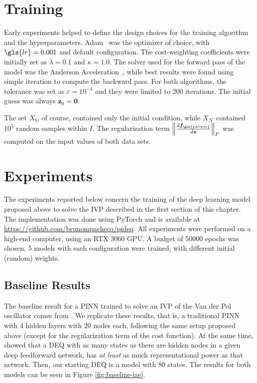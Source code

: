 \section{Training}

Early experiments helped to define the design choices for the training algorithm and the hyperparameters.
Adam~\cite{kingma_adam_2015} was the optimizer of choice, with $\gls{lr}=0.001$ and default configuration.
The cost-weighting coefficients were initially set as $\lambda=0.1$ and $\kappa=1.0$.
The solver used for the forward pass of the model was the Anderson Acceleration~\cite{walker_anderson_2011}, while best results were found using simple iteration to compute the backward pass.
For both algorithms, the tolerance was set as $\varepsilon=10^{-4}$ and they were limited to 200 iterations.
The initial guess was always $\bm{z}_0=\bm{0}$.

The set $X_b$, of course, contained only the initial condition, while $X_{\mathcal{N}}$ contained $10^5$ random samples within $I$.
The regularization term $\left\lVert \frac{d \bm{f}_{\gls{param}}}{d \bm{z}}\right\rVert_F$ was computed on the input values of both data sets.

\section{Experiments}

The experiments reported below concern the training of the deep learning model proposed above to solve the \gls{IVP} described in the first section of this chapter.
The implementation was done using PyTorch \cite{paszke_pytorch_2019} and is available at \url{https://github.com/brunompacheco/pideq}.
All experiments were performed on a high-end computer, using an RTX 3060 GPU.
A budget of 50000 epochs was chosen.
5 models with each configuration were trained, with different initial (random) weights.

\subsection{Baseline Results}

The baseline result for a \gls{PINN} trained to solve an \gls{IVP} of the Van der Pol oscillator comes from \textcite{Antonelo2021}.
We replicate these results, that is, a traditional \gls{PINN} with 4 hidden layers with 20 nodes each, following the same setup proposed above (except for the regularization term of the cost function).
At the same time, \textcite{Ghaoui2019} showed that a \gls{DEQ} with as many states as there are hidden nodes in a given deep feedforward network, has \emph{at least} as much representational power as that network.
Then, our starting \gls{DEQ} is a model with 80 states.
The results for both models can be seen in Figure \ref{fig:baseline-iae}.

